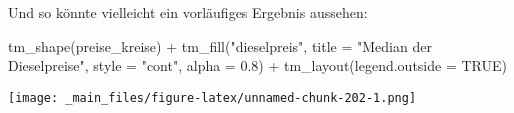 \documentclass[
  ngerman,
]{article}
\newenvironment{Shaded}{\begin{snugshade}}{\end{snugshade}}
\newcommand{\AttributeTok}[1]{\textcolor[rgb]{0.77,0.63,0.00}{#1}}
\newcommand{\ConstantTok}[1]{\textcolor[rgb]{0.00,0.00,0.00}{#1}}
\newcommand{\FloatTok}[1]{\textcolor[rgb]{0.00,0.00,0.81}{#1}}
\newcommand{\FunctionTok}[1]{\textcolor[rgb]{0.00,0.00,0.00}{#1}}
\newcommand{\NormalTok}[1]{#1}
\newcommand{\SpecialCharTok}[1]{\textcolor[rgb]{0.00,0.00,0.00}{#1}}
\newcommand{\StringTok}[1]{\textcolor[rgb]{0.31,0.60,0.02}{#1}}
\begin{document}
Und so könnte vielleicht ein vorläufiges Ergebnis aussehen:

\begin{Shaded}
\begin{Highlighting}[]
\FunctionTok{tm\_shape}\NormalTok{(preise\_kreise) }\SpecialCharTok{+}
  \FunctionTok{tm\_fill}\NormalTok{(}\StringTok{"dieselpreis"}\NormalTok{,}
          \AttributeTok{title =} \StringTok{"Median der Dieselpreise"}\NormalTok{,}
          \AttributeTok{style =} \StringTok{"cont"}\NormalTok{,}
          \AttributeTok{alpha =} \FloatTok{0.8}\NormalTok{) }\SpecialCharTok{+}
  \FunctionTok{tm\_layout}\NormalTok{(}\AttributeTok{legend.outside =} \ConstantTok{TRUE}\NormalTok{)}
\end{Highlighting}
\end{Shaded}

\texttt{[image: \_main\_files/figure-latex/unnamed-chunk-202-1.png]}
\end{document}
